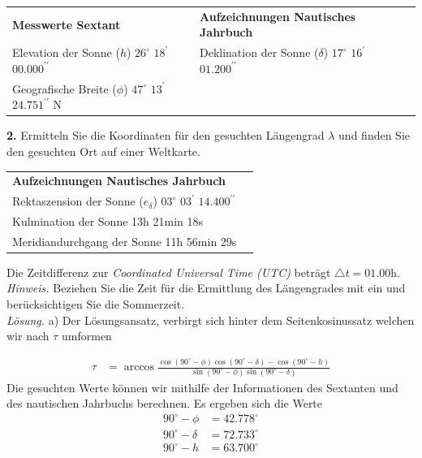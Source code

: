 \begin{refsection}
\begin{center}
\renewcommand{\arraystretch}{1.5}
\begin{tabular}{llll}
\textbf{Messwerte Sextant} & \textbf{Aufzeichnungen Nautisches Jahrbuch} \\
Elevation der Sonne ($h$) $26^{\circ}$ $18^{\prime}$ $00.000^{\prime \prime}$ & Deklination der Sonne ($\delta$)  $17^{\circ}$ $16^{\prime}$ $01.200^{\prime \prime}$ \\
Geografische Breite ($\phi$) $47^{\circ}$ $13^{\prime}$ $24.751^{\prime \prime}$ N
\end{tabular}
\end{center}


\textbf{2.} Ermitteln Sie die Koordinaten für den gesuchten Längengrad $\lambda$ und finden Sie den gesuchten Ort auf einer Weltkarte.

\begin{center}
\renewcommand{\arraystretch}{1.5}
\begin{tabular}{ll}
\textbf{Aufzeichnungen Nautisches Jahrbuch} \\
Rektaszension der Sonne ($e_\delta$) $03^{\circ}$ $03^{\prime}$ $14.400^{\prime \prime}$ \\
Kulmination der Sonne 13h 21min 18s \\
Meridiandurchgang der Sonne 11h 56min 29s
\end{tabular}
\end{center}

Die Zeitdifferenz zur \textit{Coordinated Universal Time (UTC)} beträgt $\triangle{t}=01.00$h. \\

\textit{Hinweis.} Beziehen Sie die Zeit für die Ermittlung des Längengrades mit ein und berücksichtigen Sie die Sommerzeit. \\

\textit{Lösung.} \quad a) Der Lösungsansatz, verbirgt sich hinter dem Seitenkosinussatz welchen wir nach $\tau$ umformen

\begin{align*}
\tau &= \arccos 
\frac{ \cos(90^{\circ} - \phi) \cos(90^{\circ} - \delta) - \cos(90^{\circ} - h)} {\sin(90^{\circ} - \phi)\sin(90^{\circ} - \delta)}
\end{align*}
Die gesuchten Werte können wir mithilfe der Informationen des Sextanten und des nautischen Jahrbuchs berechnen. Es ergeben sich die Werte
\begin{align*}
90^{\circ} - \phi &= 42.778^{\circ}
\\
90^{\circ} - \delta &= 72.733^{\circ}
\\
90^{\circ} - h &= 63.700^{\circ}
\end{align*}


\end{refsection}
